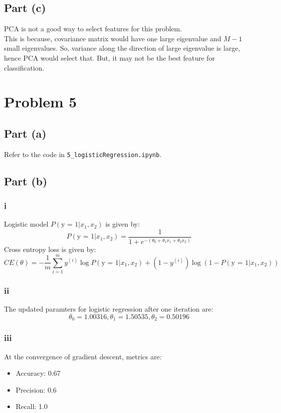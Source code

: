 \documentclass[12pt]{article}
\begin{document}
\subsection*{Part (c)}
PCA is not a good way to select features for this problem. \\
This is because, covariance matrix would have one large eigenvalue and $M-1$ small eigenvalues. 
So, variance along the direction of large eigenvalue is large, hence PCA would select that.
But, it may not be the best feature for classification.

\section*{Problem 5}
\subsection*{Part (a)}
Refer to the code in \texttt{5\_logisticRegression.ipynb}.

\subsection*{Part (b)}
\subsubsection*{i} 
Logistic model $P{(\text{y = 1} | x_1, x_2)}$ is given by:
\begin{equation*}
    P{(\text{y = 1} | x_1, x_2)} = \frac{1}{1 + e^{-(\theta_0 + \theta_1 x_1 + \theta_2 x_2)}}
\end{equation*}
Cross entropy loss is given by:
\begin{equation*}
    CE (\theta) = -\frac{1}{m} \sum_{i=1}^{m} y^{(i)} \log{P{(\text{y = 1} | x_1, x_2)}} + (1 - y^{(i)}) \log{(1 - P{(\text{y = 1} | x_1, x_2)})}
\end{equation*}
   
\subsubsection*{ii}
The updated paramters for logistic regression after one iteration are:
\begin{equation*}
    \theta_0 = 1.00316, \theta_1 = 1.50535, \theta_2 = 0.50196
\end{equation*}

\subsubsection*{iii}
At the convergence of gradient descent, metrics are:
\begin{itemize}
    \item Accuracy: 0.67
    \item Precision: 0.6
    \item Recall: 1.0
\end{itemize}
\end{document}
